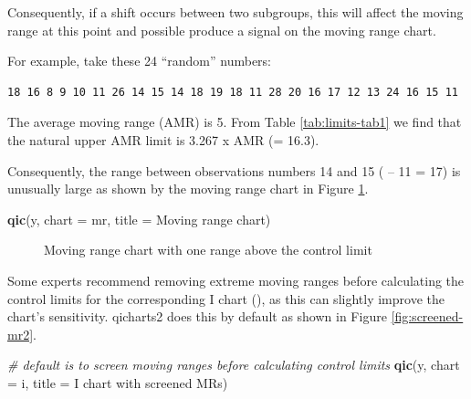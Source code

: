 \documentclass[
]{book}
\makeatletter
\newenvironment{Shaded}{\begin{snugshade}}{\end{snugshade}}
\newcommand{\AttributeTok}[1]{\textcolor[rgb]{0.13,0.29,0.53}{#1}}
\newcommand{\CommentTok}[1]{\textcolor[rgb]{0.56,0.35,0.01}{\textit{#1}}}
\newcommand{\FunctionTok}[1]{\textcolor[rgb]{0.13,0.29,0.53}{\textbf{#1}}}
\newcommand{\NormalTok}[1]{#1}
\newcommand{\StringTok}[1]{\textcolor[rgb]{0.31,0.60,0.02}{#1}}
\newcommand*\pandocbounded[1]{%
  \sbox\pandoc@box{#1}%
  \Gscale@div\@tempa{\textheight}{\dimexpr\ht\pandoc@box+\dp\pandoc@box\relax}%
  \Gscale@div\@tempb{\linewidth}{\wd\pandoc@box}%
  \ifdim\@tempb\p@<\@tempa\p@\let\@tempa\@tempb\fi%
  \ifdim\@tempa\p@<\p@\scalebox{\@tempa}{\usebox\pandoc@box}%
  \else\usebox{\pandoc@box}%
  \fi%
}
\makeatother
\begin{document}
Consequently, if a shift occurs between two subgroups, this will affect the moving range at this point and possible produce a signal on the moving range chart.

For example, take these 24 ``random'' numbers:

\begin{verbatim}
18 16 8 9 10 11 26 14 15 14 18 19 18 11 28 20 16 17 12 13 24 16 15 11
\end{verbatim}

The average moving range (AMR) is 5. From Table \ref{tab:limits-tab1} we find that the natural upper AMR limit is 3.267 x AMR (= 16.3).

Consequently, the range between observations numbers 14 and 15 ( -- 11\textbar{} = 17) is unusually large as shown by the moving range chart in Figure \ref{fig:screened-mr1}.

\begin{Shaded}
\begin{Highlighting}[]
\FunctionTok{qic}\NormalTok{(y, }
    \AttributeTok{chart =} \StringTok{\textquotesingle{}mr\textquotesingle{}}\NormalTok{, }
    \AttributeTok{title =} \StringTok{\textquotesingle{}Moving range chart\textquotesingle{}}\NormalTok{)}
\end{Highlighting}
\end{Shaded}

\begin{figure}
\centering
\pandocbounded{}
\caption{\label{fig:screened-mr1}Moving range chart with one range above the control limit}
\end{figure}

Some experts recommend removing extreme moving ranges before calculating the control limits for the corresponding I chart (), as this can slightly improve the chart's sensitivity. qicharts2 does this by default as shown in Figure \ref{fig:screened-mr2}.

\begin{Shaded}
\begin{Highlighting}[]
\CommentTok{\# default is to screen moving ranges before calculating control limits}
\FunctionTok{qic}\NormalTok{(y, }
    \AttributeTok{chart =} \StringTok{\textquotesingle{}i\textquotesingle{}}\NormalTok{, }
    \AttributeTok{title =} \StringTok{\textquotesingle{}I chart with screened MRs\textquotesingle{}}\NormalTok{)}
\end{Highlighting}
\end{Shaded}
\end{document}
